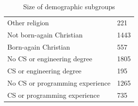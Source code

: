 \documentclass{article}
\begin{document}
\begin{table}[h]
\begin{tabular}{p{5cm}p{2.5cm}}
Other religion & 221\\

Not born-again Christian & 1443\\

Born-again Christian & 557\\

No CS or engineering degree & 1805\\

CS or engineering degree & 195\\

No CS or programming experience & 1265\\

CS or programming experience & 735\\
\hline
\end{tabular}

\caption{\label{tab:subgroups}Size of demographic subgroups}
\end{table}
\end{document}
